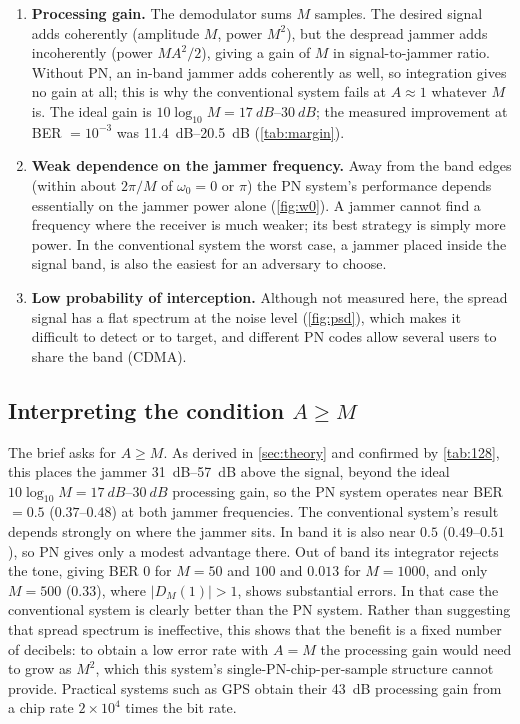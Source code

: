 \documentclass[11pt,a4paper]{article}
\begin{document}
\begin{enumerate}
  \item \textbf{Processing gain.} The demodulator sums $M$ samples. The desired signal
        adds coherently (amplitude $M$, power $M^2$), but the despread jammer adds
        incoherently (power $MA^2/2$), giving a gain of $M$ in signal-to-jammer ratio.
        Without PN, an in-band jammer adds coherently as well, so integration gives no
        gain at all; this is why the conventional system fails at $A\approx1$ whatever
        $M$ is. The ideal gain is $10\log_{10}M=\SIrange{17}{30}{dB}$; the measured
        improvement at BER $=10^{-3}$ was \SIrange{11.4}{20.5}{dB} (\cref{tab:margin}).
  \item \textbf{Weak dependence on the jammer frequency.} Away from the band edges
        (within about $2\pi/M$ of $\omega_0=0$ or $\pi$) the PN system's performance
        depends essentially on the jammer power alone (\cref{fig:w0}). A jammer
        cannot find a frequency where the receiver is much weaker; its best strategy is
        simply more power. In the conventional system the worst case, a jammer placed
        inside the signal band, is also the easiest for an adversary to choose.
  \item \textbf{Low probability of interception.} Although not measured here, the
        spread signal has a flat spectrum at the noise level (\cref{fig:psd}), which
        makes it difficult to detect or to target, and different PN codes allow
        several users to share the band (CDMA).
\end{enumerate}

\subsection{Interpreting the condition \texorpdfstring{$A\ge M$}{A >= M}}

The brief asks for $A\ge M$. As derived in \cref{sec:theory} and confirmed by
\cref{tab:128}, this places the jammer \SIrange{31}{57}{dB} above the signal, beyond
the ideal $10\log_{10}M=\SIrange{17}{30}{dB}$ processing gain, so the PN system
operates near BER $=0.5$ ($0.37$--$0.48$) at both jammer frequencies. The conventional
system's result depends strongly on where the jammer sits. In band it is also near
$0.5$ ($0.49$--$0.51$), so PN gives only a modest advantage there. Out of band its
integrator rejects the tone, giving BER $0$ for $M=50$ and $100$ and $0.013$ for
$M=1000$, and only $M=500$ ($0.33$), where $|D_M(1)|>1$, shows substantial errors.
In that case the conventional system is clearly better than the PN system. Rather than suggesting that spread spectrum is ineffective,
this shows that the benefit is a fixed number of decibels: to obtain a low error
rate with $A=M$ the processing gain would need to grow as $M^2$, which this system's
single-PN-chip-per-sample structure cannot provide. Practical systems such as GPS
obtain their \SI{43}{dB} processing gain from a chip rate $2\times10^4$ times the
bit rate.
\end{document}
